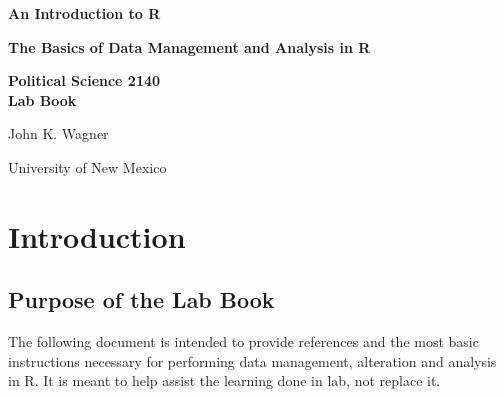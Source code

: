 \documentclass[12pt,letterpaper]{article}
\begin{document}
\raggedright

\vspace*{6em}

\begin{center}

\noindent\makebox[\linewidth]{\rule{6in}{0.4pt}}

\Large{\textbf{An Introduction to R}}

\large{\textbf{The Basics of Data Management and Analysis in R}}

\noindent\makebox[\linewidth]{\rule{6in}{0.4pt}}

\vspace*{1em}

\noindent\makebox[\linewidth]{\rule{2.5in}{0.2pt}}

\textbf{{\large Political Science 2140\\Lab Book}}
\noindent\makebox[\linewidth]{\rule{2.5in}{0.2pt}}

\vspace*{5in}

\large{John K. Wagner}
\normalsize

University of New Mexico

\end{center}

\newpage
         
            \phantom{blah blah blah blah}                  
                  
\newpage

\tableofcontents

\newpage




\begingroup
\section*{Introduction}  

\vspace{.5em}
\subsection{Purpose of the Lab Book}
The following document is intended to provide references and the most basic instructions necessary for performing data management, alteration and analysis in R. It is meant to help assist the learning done in lab, not replace it. 
\end{document}

